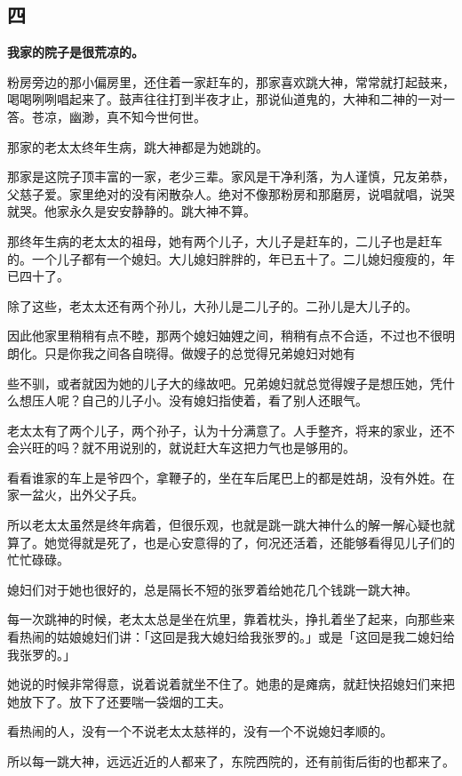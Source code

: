 \documentclass[UTF8]{ctexart}
\begin{document}
\subsection{四}

\textbf{我家的院子是很荒凉的。}

粉房旁边的那小偏房里，还住着一家赶车的，那家喜欢跳大神，常常就打起鼓来，喝喝咧咧唱起来了。鼓声往往打到半夜才止，那说仙道鬼的，大神和二神的一对一答。苍凉，幽渺，真不知今世何世。

那家的老太太终年生病，跳大神都是为她跳的。

那家是这院子顶丰富的一家，老少三辈。家风是干净利落，为人谨慎，兄友弟恭，父慈子爱。家里绝对的没有闲散杂人。绝对不像那粉房和那磨房，说唱就唱，说哭就哭。他家永久是安安静静的。跳大神不算。

那终年生病的老太太的祖母，她有两个儿子，大儿子是赶车的，二儿子也是赶车的。一个儿子都有一个媳妇。大儿媳妇胖胖的，年已五十了。二儿媳妇瘦瘦的，年已四十了。

除了这些，老太太还有两个孙儿，大孙儿是二儿子的。二孙儿是大儿子的。

因此他家里稍稍有点不睦，那两个媳妇妯娌之间，稍稍有点不合适，不过也不很明朗化。只是你我之间各自晓得。做嫂子的总觉得兄弟媳妇对她有

些不驯，或者就因为她的儿子大的缘故吧。兄弟媳妇就总觉得嫂子是想压她，凭什么想压人呢？自己的儿子小。没有媳妇指使着，看了别人还眼气。

老太太有了两个儿子，两个孙子，认为十分满意了。人手整齐，将来的家业，还不会兴旺的吗？就不用说别的，就说赶大车这把力气也是够用的。

看看谁家的车上是爷四个，拿鞭子的，坐在车后尾巴上的都是姓胡，没有外姓。在家一盆火，出外父子兵。

所以老太太虽然是终年病着，但很乐观，也就是跳一跳大神什么的解一解心疑也就算了。她觉得就是死了，也是心安意得的了，何况还活着，还能够看得见儿子们的忙忙碌碌。

媳妇们对于她也很好的，总是隔长不短的张罗着给她花几个钱跳一跳大神。

每一次跳神的时候，老太太总是坐在炕里，靠着枕头，挣扎着坐了起来，向那些来看热闹的姑娘媳妇们讲：「这回是我大媳妇给我张罗的。」或是「这回是我二媳妇给我张罗的。」

她说的时候非常得意，说着说着就坐不住了。她患的是瘫病，就赶快招媳妇们来把她放下了。放下了还要喘一袋烟的工夫。

看热闹的人，没有一个不说老太太慈祥的，没有一个不说媳妇孝顺的。

所以每一跳大神，远远近近的人都来了，东院西院的，还有前街后街的也都来了。
\end{document}
